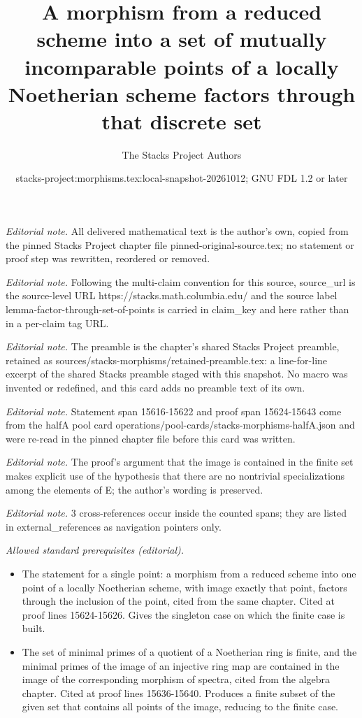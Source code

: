 \documentclass[10pt,a4paper]{amsart}
\title{A morphism from a reduced scheme into a set of mutually incomparable points of a locally Noetherian scheme factors through that discrete set}
\author{The Stacks Project Authors}
\date{stacks-project:morphisms.tex:local-snapshot-20261012; GNU FDL 1.2 or later}
\theoremstyle{plain}
\theoremstyle{definition}
\theoremstyle{remark}
\numberwithin{equation}{subsection}
\begin{document}
\maketitle
\noindent\textit{Editorial note.} All delivered mathematical text is the author's own, copied from the pinned Stacks Project chapter file pinned-original-source.tex; no statement or proof step was rewritten, reordered or removed.\par\medskip
\noindent\textit{Editorial note.} Following the multi-claim convention for this source, source\_url is the source-level URL https://stacks.math.columbia.edu/ and the source label lemma-factor-through-set-of-points is carried in claim\_key and here rather than in a per-claim tag URL.\par\medskip
\noindent\textit{Editorial note.} The preamble is the chapter's shared Stacks Project preamble, retained as sources/stacks-morphisms/retained-preamble.tex: a line-for-line excerpt of the shared Stacks preamble staged with this snapshot. No macro was invented or redefined, and this card adds no preamble text of its own.\par\medskip
\noindent\textit{Editorial note.} Statement span 15616-15622 and proof span 15624-15643 come from the halfA pool card operations/pool-cards/stacks-morphisms-halfA.json and were re-read in the pinned chapter file before this card was written.\par\medskip
\noindent\textit{Editorial note.} The proof's argument that the image is contained in the finite set makes explicit use of the hypothesis that there are no nontrivial specializations among the elements of E; the author's wording is preserved.\par\medskip
\noindent\textit{Editorial note.} 3 cross-references occur inside the counted spans; they are listed in external\_references as navigation pointers only.\par\medskip
\noindent\textit{Allowed standard prerequisites (editorial).}\begin{itemize}
\item The statement for a single point: a morphism from a reduced scheme into one point of a locally Noetherian scheme, with image exactly that point, factors through the inclusion of the point, cited from the same chapter. Cited at proof lines 15624-15626. Gives the singleton case on which the finite case is built.
\item The set of minimal primes of a quotient of a Noetherian ring is finite, and the minimal primes of the image of an injective ring map are contained in the image of the corresponding morphism of spectra, cited from the algebra chapter. Cited at proof lines 15636-15640. Produces a finite subset of the given set that contains all points of the image, reducing to the finite case.
\end{itemize}\medskip
\end{document}
